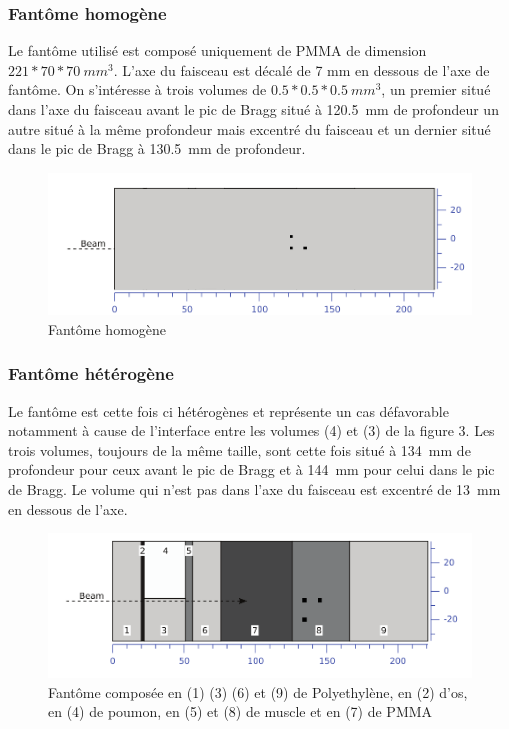 \documentclass[11pt,a4paper,oldfontcommands]{memoir}
\begin{document}
\subsubsection{Fantôme homogène}

Le fantôme utilisé est composé uniquement de PMMA de dimension $221*70*70~mm^3$. L'axe du faisceau est décalé de 7 mm en dessous de l'axe de fantôme. On s'intéresse à trois volumes de $0.5*0.5*0.5~mm^3$, un premier situé dans l'axe du faisceau avant le pic de Bragg situé à 120.5~mm de profondeur un autre situé à la même profondeur mais excentré du faisceau et un dernier situé dans le pic de Bragg à 130.5~mm de profondeur.\\
\begin{figure}[h!]
    \centering
    \includegraphics[scale = 0.3]{homo/homofant.png}
    \caption{Fantôme homogène}
    \label{fant homo}
\end{figure}{}



\openany
\subsubsection{Fantôme hétérogène}

Le fantôme est cette fois ci hétérogènes et représente un cas défavorable notamment à cause de l'interface entre les volumes (4) et (3) de la figure 3. Les trois volumes, toujours de la même taille, sont cette fois situé à 134~mm de profondeur pour ceux avant le pic de Bragg et à 144~mm pour celui dans le pic de Bragg. Le volume qui n'est pas dans l'axe du faisceau est excentré de 13~mm en dessous de l'axe. 

\begin{figure}[h]
    \centering
    \includegraphics[scale = 0.3]{Parodi/heterofant.png}
    \caption{Fantôme composée en (1) (3) (6) et (9) de Polyethylène, en (2) d'os, en (4) de poumon, en (5) et (8) de muscle et en (7) de PMMA}
    \label{hetero phant}
\end{figure}{}
\end{document}
